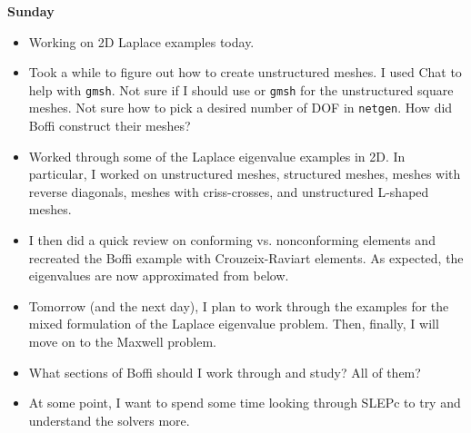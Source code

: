 \documentclass[12pt,a4paper]{article}
\begin{document}
\textbf{Sunday}
\begin{itemize}
    \item Working on 2D Laplace examples today.
    \item Took a while to figure out how to create unstructured meshes. I used Chat to help with \texttt{gmsh}. Not sure if I should use  or \texttt{gmsh} for the unstructured square meshes. Not sure how to pick a desired number of DOF in \texttt{netgen}. How did Boffi construct their meshes? 
    \item Worked through some of the Laplace eigenvalue examples in 2D. In particular, I worked on unstructured meshes, structured meshes, meshes with reverse diagonals, meshes with criss-crosses, and unstructured L-shaped meshes.
    \item I then did a quick review on conforming vs. nonconforming elements and recreated the Boffi example with Crouzeix-Raviart elements. As expected, the eigenvalues are now approximated from below. 
    \item Tomorrow (and the next day), I plan to work through the examples for the mixed formulation of the Laplace eigenvalue problem. Then, finally, I will move on to the Maxwell problem. 
    \item What sections of Boffi should I work through and study? All of them? 
    \item At some point, I want to spend some time looking through SLEPc to try and understand the solvers more. 
\end{itemize}
\end{document}
